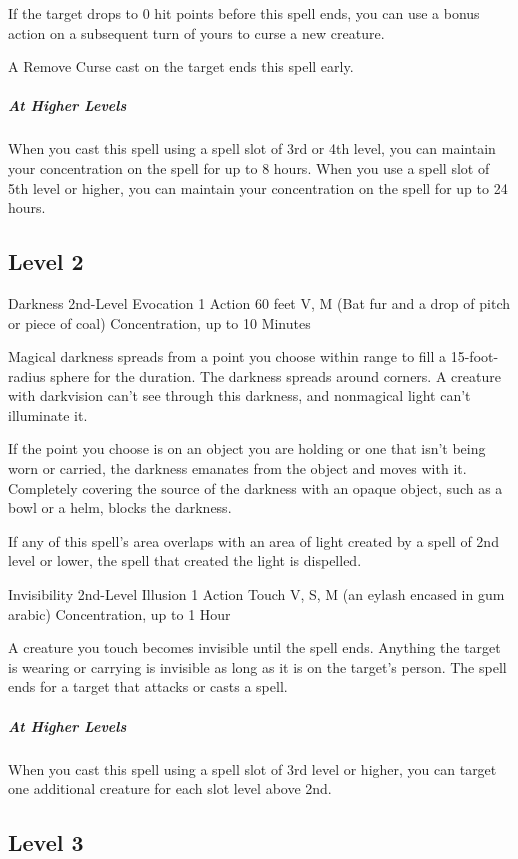{If the target drops to 0 hit points before this spell ends, you can use a bonus action on a subsequent turn of yours to curse a new creature.

A Remove Curse cast on the target ends this spell early.

\subparagraph*{At Higher Levels} When you cast this spell using a spell slot of 3rd or 4th level, you can maintain your concentration on the spell for up to 8 hours. When you use a spell slot of 5th level or higher, you can maintain your concentration on the spell for up to 24 hours.

\subsection*{Level 2}

\DndSpellHeader
	{Darkness}
	{2nd-Level Evocation}
	{1 Action}
	{60 feet}
	{V, M (Bat fur and a drop of pitch or piece of coal)}
	{Concentration, up to 10 Minutes}
	
Magical darkness spreads from a point you choose within range to fill a 15-foot-radius sphere for the duration. The darkness spreads around corners. A creature with darkvision can't see through this darkness, and nonmagical light can't illuminate it.

If the point you choose is on an object you are holding or one that isn't being worn or carried, the darkness emanates from the object and moves with it. Completely covering the source of the darkness with an opaque object, such as a bowl or a helm, blocks the darkness.

If any of this spell's area overlaps with an area of light created by a spell of 2nd level or lower, the spell that created the light is dispelled.
	
\DndSpellHeader
	{Invisibility}
	{2nd-Level Illusion}
	{1 Action}
	{Touch}
	{V, S, M (an eylash encased in gum arabic)}
	{Concentration, up to 1 Hour}

A creature you touch becomes invisible until the spell ends. Anything the target is wearing or carrying is invisible as long as it is on the target's person. The spell ends for a target that attacks or casts a spell.

\subparagraph*{At Higher Levels} When you cast this spell using a spell slot of 3rd level or higher, you can target one additional creature for each slot level above 2nd.

\subsection*{Level 3}

}
